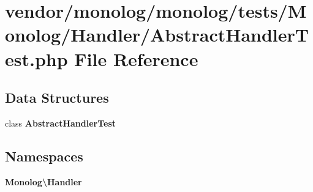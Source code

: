 \section{vendor/monolog/monolog/tests/\+Monolog/\+Handler/\+Abstract\+Handler\+Test.php File Reference}
\label{_abstract_handler_test_8php}
\subsection*{Data Structures}
\begin{DoxyCompactItemize}
\item 
class {\bf Abstract\+Handler\+Test}
\end{DoxyCompactItemize}
\subsection*{Namespaces}
\begin{DoxyCompactItemize}
\item 
 {\bf Monolog\textbackslash{}\+Handler}
\end{DoxyCompactItemize}
